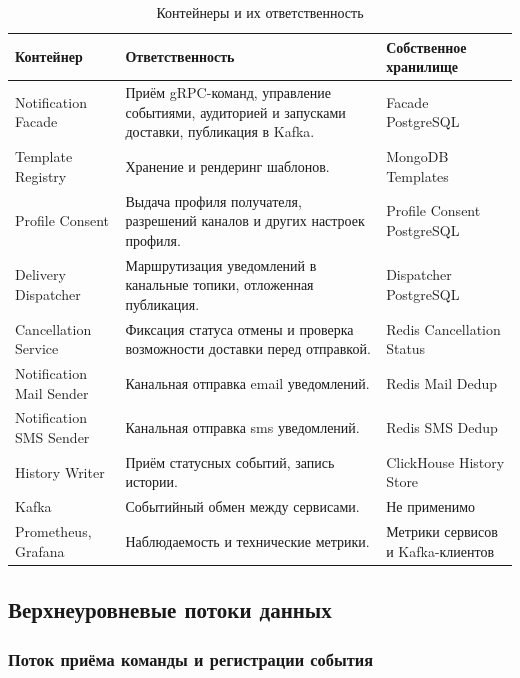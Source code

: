 \begin{table}[H]
    \centering
    \footnotesize
    \renewcommand{\arraystretch}{1.15}
    \caption{Контейнеры и их ответственность}
    \label{tab:architecture-containers}
    \begin{tabular}{|L{0.24\textwidth}|L{0.38\textwidth}|L{0.25\textwidth}|}
        \hline
        \textbf{Контейнер} & \textbf{Ответственность} & \textbf{Собственное хранилище} \\
        \hline
        Notification Facade & Приём gRPC-команд, управление событиями, аудиторией и запусками доставки, публикация в Kafka. & Facade PostgreSQL \\
        \hline
        Template Registry & Хранение и рендеринг шаблонов. & MongoDB Templates \\
        \hline
        Profile Consent & Выдача профиля получателя, разрешений каналов и других настроек профиля. & Profile Consent PostgreSQL \\
        \hline
        Delivery Dispatcher & Маршрутизация уведомлений в канальные топики, отложенная публикация. & Dispatcher PostgreSQL \\
        \hline
        Cancellation Service & Фиксация статуса отмены и проверка возможности доставки перед отправкой. & Redis Cancellation Status \\
        \hline
        Notification Mail Sender & Канальная отправка email уведомлений. & Redis Mail Dedup \\
        \hline
        Notification SMS Sender & Канальная отправка sms уведомлений. & Redis SMS Dedup \\
        \hline
        History Writer & Приём статусных событий, запись истории. & ClickHouse History Store \\
        \hline
        Kafka & Событийный обмен между сервисами. & Не применимо \\
        \hline
        Prometheus, Grafana & Наблюдаемость и технические метрики. & Метрики сервисов и Kafka-клиентов \\
        \hline
    \end{tabular}
\end{table}

\subsection{Верхнеуровневые потоки данных}

\subsubsection{Поток приёма команды и регистрации события}

